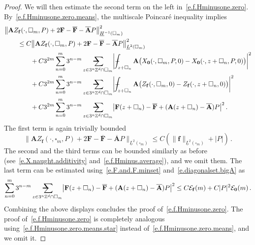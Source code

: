 \documentclass[11pt,twoside]{article} %
\makeatletter
\let\oldsquare\square %
\renewcommand{\square}{\oldsquare}
\numberwithin{equation}{section}
\theoremstyle{definition}
\newcommand*{\Z}{\ensuremath{\mathbb{Z}}}
\newcommand{\f}{\mathbf{f}}
\newcommand{\bfzero}{\boldsymbol{0}}
\newcommand{\cu}{\square}
\newcommand{\avsum}{\mathop{\mathpalette\avsuminner\relax}\displaylimits}
\newcommand\avsuminner[2]{%
  {\sbox0{$\m@th#1\sum$}%
   \vphantom{\usebox0}%
   \ooalign{%
     \hidewidth
     \smash{\,\rule[.23em]{8.8pt}{1.1pt} \relax}%
     \hidewidth\cr
   ~$\m@th#1\sum$\cr
   }%
  }%
}
\def\Xint#1{\mathchoice
{\XXint\displaystyle\textstyle{#1}}%
{\XXint\textstyle\scriptstyle{#1}}%
{\XXint\scriptstyle\scriptscriptstyle{#1}}%
{\XXint\scriptscriptstyle\scriptscriptstyle{#1}}%
\!\int}
\def\XXint#1#2#3{{\setbox0=\hbox{$#1{#2#3}{\int}$}
\vcenter{\hbox{$#2#3$}}\kern-.5\wd0}}
\def\fint{\Xint-}
\newcommand{\bfA}{\mathbf{A}}
\newcommand{\bfAhom}{\overline{\mathbf{A}}}
\newcommand{\bfF}{\mathbf{F}}
\makeatother
\begin{document}
\begin{proof}
\smallskip 

We will then estimate the second term on the left in~\eqref{e.f.Hminusone.zero}. By~\eqref{e.f.Hminusone.zero.means}, the  multiscale Poincar\'e inequality implies
\begin{align*} 
\lefteqn{
\bigl\| \bfA Z_{\f}(\cdot,\cu_m,P) + 2 \bfF - \overline{\bfF} - \bfAhom P\bigr\|_{\underline{H}^{-1}(\cu_m)}^2
} \qquad &
\notag \\ &
\leq 
C\bigl\| \bfA Z_{\f}(\cdot,\cu_m,P) + 2 \bfF - \overline{\bfF} - \bfAhom P  \bigr\|_{\underline{L}^{2}(\cu_m)}^2
\notag \\ & \qquad 
+ 
C 3^{2m}\sum_{n=0}^{m} 3^{n-m} \avsum_{z \in 3^n \Z^d \cap \cu_m}   \biggl| \fint_{z + \cu_n} \bfA \bigl(  X_{\bfzero}(\cdot,\cu_m,P,0) -  X_{\bfzero}(\cdot,z+\cu_n,P,0)  \bigr) \biggr|^2
\notag \\ & \qquad 
+ 
C 3^{2m} \sum_{n=0}^{m} 3^{n-m} \avsum_{z \in 3^n \Z^d \cap \cu_m}   \biggl| \fint_{z + \cu_n} \bfA \bigl(  Z_{\f}(\cdot,\cu_m,0) - Z_{\f}(\cdot,z+\cu_n,0)  \bigr) \biggr|^2
\notag \\ & \qquad 
+ 
C 3^{2m} \sum_{n=0}^{m} 3^{n-m} \avsum_{z \in 3^n \Z^d \cap \cu_m}   \bigl| \bfF(z+\cu_n) - \overline{\bfF} + (\bfA(z+\cu_n) - \bfAhom)P   \bigr|^2
\,.
\end{align*}
The first term is again trivially bounded 
\begin{equation*} 
\bigl\| \bfA Z_{\f}(\cdot,\cu_m,P) + 2 \bfF - \overline{\bfF} - \bfAhom P  \bigr\|_{\underline{L}^{2}(\cu_m)} 
\leq C(\| \f \|_{\underline{L}^2(\cu_m)}+|P|) \,.
\end{equation*}
The second and the third terms can be bounded similarly as before (see~\eqref{e.X.naught.additivity} and~\eqref{e.f.Hminus.average}), and we omit them. The last term can be estimated using~\eqref{e.F.and.F.minset} and~\eqref{e.diagonalset.bigA} as
\begin{equation*} 
\sum_{n=0}^{m} 3^{n-m} \avsum_{z \in 3^n \Z^d \cap \cu_m}   \bigl| \bfF(z+\cu_n) - \overline{\bfF} + (\bfA(z+\cu_n) - \bfAhom)P   \bigr|^2 
\leq
C\mathcal{E}_{\f}(m) + C |P|^2 \mathcal{E}_{\bfzero}(m)
\,.
\end{equation*}
Combining the above displays concludes the proof of~\eqref{e.f.Hminusone.zero}. The proof of~\eqref{e.f.Hminusone.zero} is completely analogous using~\eqref{e.f.Hminusone.zero.means.star} instead of~\eqref{e.f.Hminusone.zero.means}, and we omit it. 
\end{proof}
\end{document}
